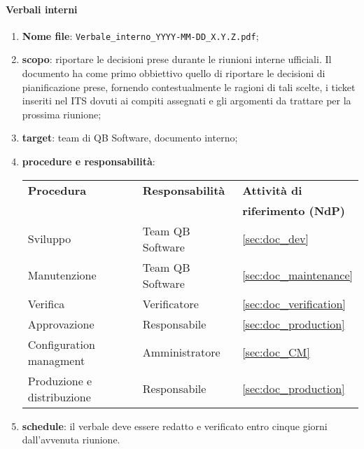         \paragraph{Verbali interni}
            \begin{enumerate}
                \item \textbf{Nome file}: \texttt{Verbale\_interno\_YYYY-MM-DD\_X.Y.Z.pdf};
                \item \textbf{scopo}: riportare le decisioni prese durante le riunioni interne ufficiali. Il documento ha come primo obbiettivo quello di riportare le decisioni di pianificazione prese, fornendo contestualmente le ragioni di tali scelte, i ticket inseriti nel ITS dovuti ai compiti assegnati e gli argomenti da trattare per la prossima riunione;
                \item \textbf{target}: team di QB Software, documento interno;
                \item \textbf{procedure e responsabilità}:
                \\
                \begin{tabularx}{0.93\textwidth}{|X|X|X|}
                    \hline
                    \textbf{Procedura} & \textbf{Responsabilità} & \textbf{Attività di} \\
                    & & \textbf{riferimento (NdP)} \\
                    \hline
                    Sviluppo & Team QB Software &  \ref{sec:doc_dev}
                    \\\hline
                    Manutenzione & Team QB Software & \ref{sec:doc_maintenance}
                    \\\hline
                    Verifica & Verificatore & \ref{sec:doc_verification}
                    \\\hline
                    Approvazione & Responsabile & \ref{sec:doc_production}
                    \\\hline
                    Configuration managment & Amministratore & \ref{sec:doc_CM}
                    \\\hline
                    Produzione e distribuzione & Responsabile & \ref{sec:doc_production}
                    \\\hline
                \end{tabularx}
                \item \textbf{schedule}: il verbale deve essere redatto e verificato entro cinque giorni dall'avvenuta riunione.
            \end{enumerate} 

